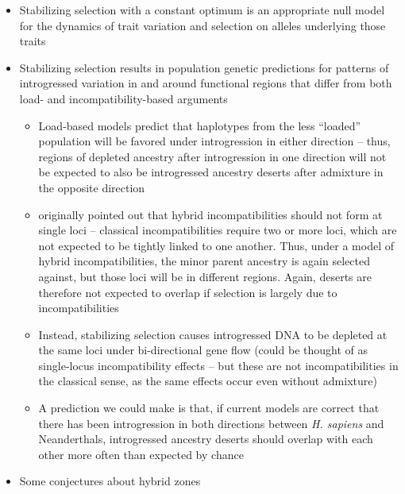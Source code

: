 \documentclass{article}
\begin{document}
\begin{itemize}
    \item Stabilizing selection with a constant optimum is an appropriate
        null model for the dynamics of trait variation and selection on
        alleles underlying those traits
    \item Stabilizing selection results in population genetic predictions
        for patterns of introgressed variation in and around functional
        regions that differ from both load- and incompatibility-based arguments
        \begin{itemize}
            \item Load-based models predict that haplotypes from the less ``loaded''
                population will be favored under introgression in either direction
                -- thus, regions of depleted ancestry after introgression in one
                direction will not be expected to also be introgressed ancestry
                deserts after admixture in the opposite direction
            \item \citet{mueller1942} originally pointed out that hybrid
                incompatibilities should not form at single loci -- classical
                incompatibilities require two or more loci, which are not
                expected to be tightly linked to one another. Thus, under a
                model of hybrid incompatibilities, the minor parent ancestry
                is again selected against, but those loci will be in different
                regions. Again, deserts are therefore not expected to overlap
                if selection is largely due to incompatibilities
            \item Instead, stabilizing selection causes introgressed DNA to be
                depleted at the same loci under bi-directional gene flow
                (could be thought of as single-locus incompatibility effects --
                but these are not incompatibilities in the classical sense,
                as the same effects occur even without admixture)
            \item A prediction we could make is that, if current models are correct
                that there has been introgression in both directions between
                \emph{H. sapiens} and Neanderthals, introgressed ancestry deserts
                should overlap with each other more often than expected by chance
        \end{itemize}
    \item Some conjectures about hybrid zones
\end{itemize}
\end{document}
